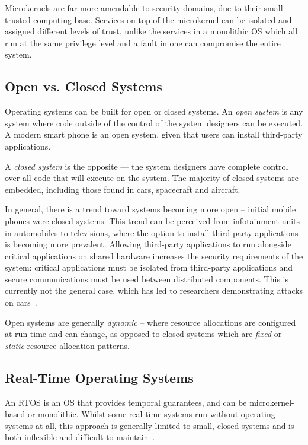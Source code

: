 Microkernels are far more amendable to security domains, due to their small trusted computing base.
Services on top of the microkernel can be isolated and assigned different levels of trust, unlike
the services in a monolithic \gls{OS} which all run at the same privilege level and a fault in one
can compromise the entire system. 

\subsection{Open vs. Closed Systems}

Operating systems can be built for open or closed systems.
An \emph{open system} is any system where code outside of the control of the system designers can be executed.
A modern smart phone is an open system, given that users can install third-party applications.

A \emph{closed system} is the opposite --- the system designers have complete control over all code that will execute on the system.
The majority of closed systems are embedded, including those found in cars, spacecraft and aircraft.

In general, there is a trend toward systems becoming more open -- initial mobile phones were closed systems.
This trend can be perceived from infotainment units in automobiles to televisions, where the option to install third party applications is becoming more prevalent.
Allowing third-party applications to run alongside critical applications on shared hardware increases the security requirements of the system: critical applications must be isolated from third-party applications and secure communications must be used between distributed components.
This is currently not the general case, which has led to researchers demonstrating attacks on cars~\citep{Checkoway_MKASSKCRK_11}.

Open systems are generally \emph{dynamic} -- where resource allocations are configured at run-time and can change, as opposed to closed systems which are \emph{fixed} or \emph{static} resource allocation patterns.

\subsection{Real-Time Operating Systems}

An \gls{RTOS} is an \gls{OS} that provides temporal guarantees, and can be microkernel-based or monolithic.
 Whilst some real-time systems run without operating systems at all, this approach is generally limited to small, closed systems and is both inflexible and difficult to maintain~\citep{Lui_AACBBBCLM_2004}.

